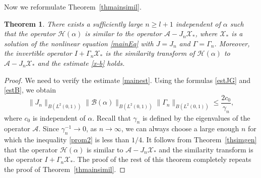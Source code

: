 \documentclass[11pt,centertags,reqno,twoside]{amsart}
\numberwithin{equation}{section}
\newtheorem{theorem}{Theorem}
\theoremstyle{definition}
\theoremstyle{remark}
\begin{document}
Now we reformulate Theorem~\ref{thmainsimil}.
\begin{theorem}\label{thmainsimil1}
There exists a sufficiently large $n\geqslant l+1$ independent of $\alpha$
such that the operator $\mathcal{H}(\alpha)$ is similar to the operator
$\mathcal{A}-J_n\mathcal{X}_*$, where $\mathcal{X}_*$ is a solution
of the nonlinear equation \eqref{mainEq} with $J=J_n$ and $\Gamma=\Gamma_n$. Moreover, the invertible operator
$I+\Gamma_n\mathcal{X}_*$ is the similarity transform of $\mathcal{H}(\alpha)$ to
$\mathcal{A}-J_n\mathcal{X}_*$ and the estimate \eqref{x-b} holds.
\end{theorem}
\begin{proof}
We need to verify the estimate \eqref{mainest}. Using the formulas
\eqref{estJG} and \eqref{estB}, we obtain
\begin{equation}\label{prom2}
\|J_n\|_{B(L^2(0, 1))}\|\mathcal{B}(\alpha)\|_{B(L^2(0, 1))}\|\Gamma_n\|_{B(L^2(0, 1))}
\leqslant \frac{2c_0}{\gamma_n},
\end{equation}
where $c_0$ is independent of $\alpha$. Recall that $\gamma_n$ is defined by the eigenvalues
of the operator $\mathcal{A}$. Since $\gamma_n^{-1}\to 0$,
as $n\to\infty$, we can always choose a large enough $n$ for which the inequality \eqref{prom2}
is less than $1/4$. It follows from Theorem~\ref{thsimgen} that the operator
$\mathcal{H}(\alpha)$ is similar to $\mathcal{A}-J_n\mathcal{X}_*$ and the similarity
transform is the operator $I+\Gamma_n\mathcal{X}_*$. The proof of the rest of
this theorem completely repeats the proof of Theorem~\ref{thmainsimil}.
\end{proof}
\end{document}
